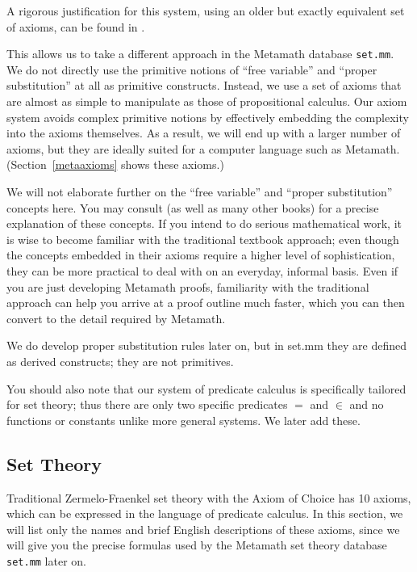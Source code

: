 A rigorous justification for this system, using an older but
exactly equivalent set of axioms, can be
found in \cite{Megill}.

This allows us to
take a different approach in the Metamath database
\texttt{set.mm}.  We do not
directly use the primitive notions of ``free variable''
and ``proper substitution'' at all as primitive constructs.
Instead, we use a set
of axioms that are almost as simple to manipulate as those of
propositional calculus.  Our axiom system avoids complex primitive
notions by effectively embedding the complexity into the axioms
themselves.  As a result, we will end up with a larger number of axioms,
but they are ideally suited for a computer language such as Metamath.
(Section~\ref{metaaxioms} shows these axioms.)

We will not elaborate further
on the ``free variable'' and ``proper substitution''
concepts here.  You may consult
\cite[ch.\ 3--4]{Hamilton} (as well as
many other books) for a precise explanation
of these concepts.  If you intend to do serious mathematical work, it is wise
to become familiar with the traditional textbook approach; even though the
concepts embedded in their axioms require a higher level of sophistication,
they can be more practical to deal with on an everyday, informal basis.  Even
if you are just developing Metamath proofs, familiarity with the traditional
approach can help you arrive at a proof outline much faster, which you can
then convert to the detail required by Metamath.

We do develop proper substitution rules later on, but in set.mm
they are defined as derived constructs; they are not primitives.

You should also note that our system of predicate calculus is specifically
tailored for set theory; thus there are only two specific predicates $=$ and
$\in$ and no functions
or constants unlike more general systems.
We later add these.

\subsection{Set Theory}

Traditional Zermelo-Fraenkel set theory with the Axiom of Choice
has 10 axioms, which can be expressed in the
language of predicate calculus.  In this section, we will list only the
names and brief English descriptions of these axioms, since we will give
you the precise formulas used by the Metamath set theory
database \texttt{set.mm} later on.

